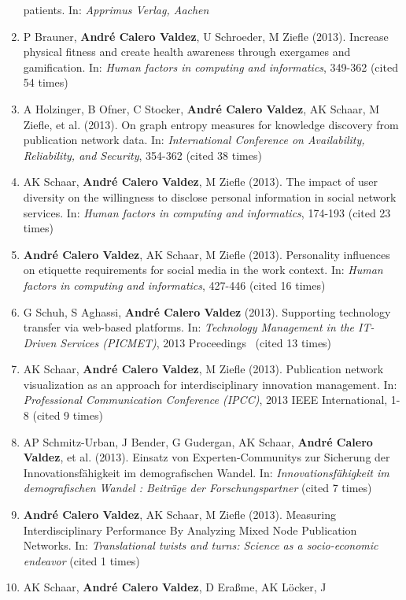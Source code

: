 \documentclass[11pt,a4paper,sans]{moderncv}
\begin{document}
\begin{enumerate}
  patients. In: \emph{Apprimus Verlag, Aachen}
\item
  P Brauner, \textbf{André Calero Valdez}, U Schroeder, M Ziefle (2013).
  Increase physical fitness and create health awareness through
  exergames and gamification. In: \emph{Human factors in computing and
  informatics}, 349-362 (cited 54 times)
\item
  A Holzinger, B Ofner, C Stocker, \textbf{André Calero Valdez}, AK
  Schaar, M Ziefle, et al. (2013). On graph entropy measures for
  knowledge discovery from publication network data. In:
  \emph{International Conference on Availability, Reliability, and
  Security}, 354-362 (cited 38 times)
\item
  AK Schaar, \textbf{André Calero Valdez}, M Ziefle (2013). The impact
  of user diversity on the willingness to disclose personal information
  in social network services. In: \emph{Human factors in computing and
  informatics}, 174-193 (cited 23 times)
\item
  \textbf{André Calero Valdez}, AK Schaar, M Ziefle (2013). Personality
  influences on etiquette requirements for social media in the work
  context. In: \emph{Human factors in computing and informatics},
  427-446 (cited 16 times)
\item
  G Schuh, S Aghassi, \textbf{André Calero Valdez} (2013). Supporting
  technology transfer via web-based platforms. In: \emph{Technology
  Management in the IT-Driven Services (PICMET)}, 2013 Proceedings~
  (cited 13 times)
\item
  AK Schaar, \textbf{André Calero Valdez}, M Ziefle (2013). Publication
  network visualization as an approach for interdisciplinary innovation
  management. In: \emph{Professional Communication Conference (IPCC)},
  2013 IEEE International, 1-8 (cited 9 times)
\item
  AP Schmitz-Urban, J Bender, G Gudergan, AK Schaar, \textbf{André
  Calero Valdez}, et al. (2013). Einsatz von Experten-Communitys zur
  Sicherung der Innovationsfähigkeit im demografischen Wandel. In:
  \emph{Innovationsfähigkeit im demografischen Wandel : Beiträge der
  Forschungspartner} (cited 7 times)
\item
  \textbf{André Calero Valdez}, AK Schaar, M Ziefle (2013). Measuring
  Interdisciplinary Performance By Analyzing Mixed Node Publication
  Networks. In: \emph{Translational twists and turns: Science as a
  socio-economic endeavor} (cited 1 times)
\item
  AK Schaar, \textbf{André Calero Valdez}, D Eraßme, AK Löcker, J

\end{enumerate}
\end{document}
